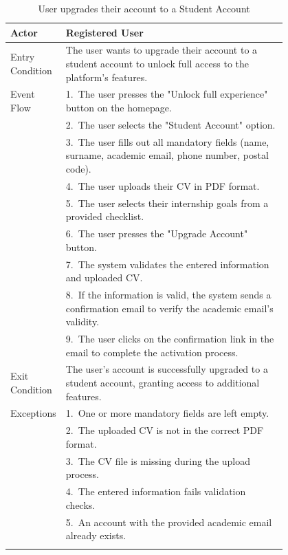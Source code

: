 \begin{center} 
    \renewcommand{\arraystretch}{1.2} 
    \begin{longtable}{ l p{0.8\linewidth} } 
        \hline 
        Actor & Registered User \\ \hline 
        Entry Condition & The user wants to upgrade their account to a student account to unlock full access to the platform's features. \\ \hline 
        Event Flow & 1.\ The user presses the "Unlock full experience" button on the homepage. \\ 
        & 2.\ The user selects the "Student Account" option. \\  
        & 3.\ The user fills out all mandatory fields (name, surname, academic email, phone number, postal code). \\ 
        & 4.\ The user uploads their CV in PDF format. \\ 
        & 5.\ The user selects their internship goals from a provided checklist. \\ 
        & 6.\ The user presses the "Upgrade Account" button. \\ 
        & 7.\ The system validates the entered information and uploaded CV. \\ 
        & 8.\ If the information is valid, the system sends a confirmation email to verify the academic email's validity. \\ 
        & 9.\ The user clicks on the confirmation link in the email to complete the activation process. \\ \hline 
        Exit Condition & The user's account is successfully upgraded to a student account, granting access to additional features. \\ \hline 
        Exceptions & 1.\ One or more mandatory fields are left empty. \\ 
        & 2.\ The uploaded CV is not in the correct PDF format. \\ 
        & 3.\ The CV file is missing during the upload process. \\ 
        & 4.\ The entered information fails validation checks. \\
        & 5.\ An account with the provided academic email already exists. \\ \hline 
        \caption{User upgrades their account to a Student Account} 
        \label{tab:student_activation_uc} 
    \end{longtable} 
\end{center}

